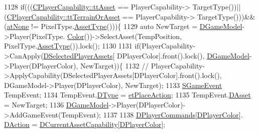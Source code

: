 \begin{DoxyCode}
1128                     \textcolor{keywordflow}{if}(((\hyperlink{classCPlayerCapability_a9d3450ed1532fd536bd6cbb1e2eef02facb6ee2a28b5d50b9d3009c272f2881aa}{CPlayerCapability::ttAsset} == PlayerCapability->
      TargetType())||(\hyperlink{classCPlayerCapability_a9d3450ed1532fd536bd6cbb1e2eef02fa67cc6d11bc0aafc1b786bd6557ba4aa2}{CPlayerCapability::ttTerrainOrAsset} == PlayerCapability->
      TargetType()))&&(\hyperlink{GameDataTypes_8h_a5600d4fc433b83300308921974477feca82fb51718e2c00981a2d37bc6fe92593}{atNone} != PixelType.\hyperlink{classCPixelType_addcf6c6d11e8ebafe4455beaa995b675}{AssetType}()))\{
1129                         \textcolor{keyword}{auto} NewTarget = \hyperlink{classCApplicationData_a32b50c7c1cbac3cfd67c7f775b1d6fee}{DGameModel}->Player(PixelType.
      \hyperlink{classCPixelType_a54864220447608dfad4cd579a5a4016c}{Color}())->SelectAsset(TempPosition, PixelType.\hyperlink{classCPixelType_addcf6c6d11e8ebafe4455beaa995b675}{AssetType}()).lock();
1130                         
1131                         \textcolor{keywordflow}{if}(PlayerCapability->CanApply(\hyperlink{classCApplicationData_a05c1087d5a5c4ddc14fcb37444f1642b}{DSelectedPlayerAssets}[
      DPlayerColor].front().lock(), \hyperlink{classCApplicationData_a32b50c7c1cbac3cfd67c7f775b1d6fee}{DGameModel}->Player(DPlayerColor), NewTarget))\{
1132                             \textcolor{comment}{//
      PlayerCapability->ApplyCapability(DSelectedPlayerAssets[DPlayerColor].front().lock(), DGameModel->Player(DPlayerColor), NewTarget);}
1133                             \hyperlink{structSGameEvent}{SGameEvent} TempEvent;
1134                             TempEvent.\hyperlink{structSGameEvent_afa10562e243f4ac2b473b655cc58fee7}{DType} = \hyperlink{GameModel_8h_abfcf510bafec7c6429906a6ecaac656da6b069d43a732ecd2eec5fbcebf3e41ee}{etPlaceAction};
1135                             TempEvent.\hyperlink{structSGameEvent_a40c85eeac83b96887b7449c9bdc5d624}{DAsset} = NewTarget;
1136                             \hyperlink{classCApplicationData_a32b50c7c1cbac3cfd67c7f775b1d6fee}{DGameModel}->Player(DPlayerColor)->AddGameEvent(TempEvent);
1137                             
1138                             \hyperlink{classCApplicationData_a2df1addeb7622233f72dc056bbcf31a1}{DPlayerCommands}[\hyperlink{classCApplicationData_a53550939b20cba70570f113e4d1c5d02}{DPlayerColor}].
      \hyperlink{structSPlayerCommandRequest_a80897bbccf2c4e0b148a7aa815a926c6}{DAction} = \hyperlink{classCApplicationData_a7e0dbfdc54f73dfa9838ae81b8017e2d}{DCurrentAssetCapability}[\hyperlink{classCApplicationData_a53550939b20cba70570f113e4d1c5d02}{DPlayerColor}];

\end{DoxyCode}
